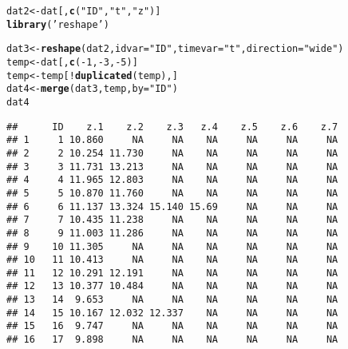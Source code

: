 \documentclass{article}\usepackage[]{graphicx}\usepackage[]{color}
\makeatletter
\newcommand{\hlnum}[1]{\textcolor[rgb]{0.686,0.059,0.569}{#1}}%
\newcommand{\hlstr}[1]{\textcolor[rgb]{0.192,0.494,0.8}{#1}}%
\newcommand{\hlopt}[1]{\textcolor[rgb]{0,0,0}{#1}}%
\newcommand{\hlstd}[1]{\textcolor[rgb]{0.345,0.345,0.345}{#1}}%
\newcommand{\hlkwb}[1]{\textcolor[rgb]{0.69,0.353,0.396}{#1}}%
\newcommand{\hlkwc}[1]{\textcolor[rgb]{0.333,0.667,0.333}{#1}}%
\newcommand{\hlkwd}[1]{\textcolor[rgb]{0.737,0.353,0.396}{\textbf{#1}}}%
\newenvironment{kframe}{%
 \def\at@end@of@kframe{}%
 \ifinner\ifhmode%
  \def\at@end@of@kframe{\end{minipage}}%
  \begin{minipage}{\columnwidth}%
 \fi\fi%
 \def\FrameCommand##1{\hskip\@totalleftmargin \hskip-\fboxsep
 \colorbox{shadecolor}{##1}\hskip-\fboxsep
     \hskip-\linewidth \hskip-\@totalleftmargin \hskip\columnwidth}%
 \MakeFramed {\advance\hsize-\width
   \@totalleftmargin\z@ \linewidth\hsize
   \@setminipage}}%
 {\par\unskip\endMakeFramed%
 \at@end@of@kframe}
\newenvironment{knitrout}{}{} %
\makeatother
\begin{document}
\begin{knitrout}
\color{fgcolor}\begin{kframe}
\begin{alltt}
\hlstd{dat2}\hlkwb{<-}\hlstd{dat[,}\hlkwd{c}\hlstd{(}\hlstr{"ID"}\hlstd{,}\hlstr{"t"}\hlstd{,}\hlstr{"z"}\hlstd{)]}
\hlkwd{library}\hlstd{(}\hlstr{'reshape'}\hlstd{)}
\end{alltt}


{\ttfamily\noindent\itshape\color{messagecolor}{\#\# Loading required package: plyr\\\#\# \\\#\# Attaching package: 'reshape'\\\#\# \\\#\# The following objects are masked from 'package:plyr':\\\#\# \\\#\#\ \ \ \  rename, round\_any}}\begin{alltt}
\hlstd{dat3}\hlkwb{<-}\hlkwd{reshape}\hlstd{(dat2,} \hlkwc{idvar} \hlstd{=} \hlstr{"ID"}\hlstd{,} \hlkwc{timevar} \hlstd{=} \hlstr{"t"}\hlstd{,} \hlkwc{direction} \hlstd{=} \hlstr{"wide"}\hlstd{)}
\hlstd{temp}\hlkwb{<-}\hlstd{dat[,}\hlkwd{c}\hlstd{(}\hlopt{-}\hlnum{1}\hlstd{,}\hlopt{-}\hlnum{3}\hlstd{,}\hlopt{-}\hlnum{5}\hlstd{)]}
\hlstd{temp}\hlkwb{<-}\hlstd{temp[}\hlopt{!}\hlkwd{duplicated}\hlstd{(temp),]}
\hlstd{dat4}\hlkwb{<-}\hlkwd{merge}\hlstd{(dat3,temp,}\hlkwc{by}\hlstd{=}\hlstr{"ID"}\hlstd{)}
\hlstd{dat4}
\end{alltt}
\begin{verbatim}
##      ID    z.1    z.2    z.3   z.4    z.5    z.6    z.7
## 1     1 10.860     NA     NA    NA     NA     NA     NA
## 2     2 10.254 11.730     NA    NA     NA     NA     NA
## 3     3 11.731 13.213     NA    NA     NA     NA     NA
## 4     4 11.965 12.803     NA    NA     NA     NA     NA
## 5     5 10.870 11.760     NA    NA     NA     NA     NA
## 6     6 11.137 13.324 15.140 15.69     NA     NA     NA
## 7     7 10.435 11.238     NA    NA     NA     NA     NA
## 8     9 11.003 11.286     NA    NA     NA     NA     NA
## 9    10 11.305     NA     NA    NA     NA     NA     NA
## 10   11 10.413     NA     NA    NA     NA     NA     NA
## 11   12 10.291 12.191     NA    NA     NA     NA     NA
## 12   13 10.377 10.484     NA    NA     NA     NA     NA
## 13   14  9.653     NA     NA    NA     NA     NA     NA
## 14   15 10.167 12.032 12.337    NA     NA     NA     NA
## 15   16  9.747     NA     NA    NA     NA     NA     NA
## 16   17  9.898     NA     NA    NA     NA     NA     NA

\end{verbatim}
\end{kframe}
\end{knitrout}
\end{document}
